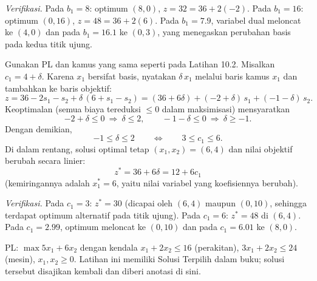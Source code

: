 \emph{Verifikasi.} Pada $b_1 = 8$: optimum $(8, 0)$, $z = 32 = 36 + 2(-2)$. Pada $b_1 = 16$: optimum $(0, 16)$, $z = 48 = 36 + 2(6)$. Pada $b_1 = 7.9$, variabel dual meloncat ke $(4, 0)$ dan pada $b_1 = 16.1$ ke $(0, 3)$, yang menegaskan perubahan basis pada kedua titik ujung.


Gunakan PL dan kamus yang sama seperti pada Latihan 10.2. Misalkan $c_1 = 4 + \delta$. Karena $x_1$ bersifat basis, nyatakan $\delta\, x_1$ melalui baris kamus $x_1$ dan tambahkan ke baris objektif:
\[
z = 36 - 2s_1 - s_2 + \delta\,(6 + s_1 - s_2)
  = (36 + 6\delta) + (-2 + \delta)\,s_1 + (-1 - \delta)\,s_2 .
\]
Keoptimalan (semua biaya tereduksi $\le 0$ dalam maksimisasi) mensyaratkan
\[
-2 + \delta \le 0 \ \Rightarrow\ \delta \le 2,
\qquad
-1 - \delta \le 0 \ \Rightarrow\ \delta \ge -1 .
\]
Dengan demikian,
\[
-1 \le \delta \le 2
\qquad\Longleftrightarrow\qquad
\boxed{3 \le c_1 \le 6}.
\]
Di dalam rentang, solusi optimal tetap $(x_1, x_2) = (6, 4)$ dan nilai objektif berubah secara linier:
\[
z^* = 36 + 6\delta = 12 + 6 c_1
\]
(kemiringannya adalah $x_1^* = 6$, yaitu nilai variabel yang koefisiennya berubah).

\emph{Verifikasi.} Pada $c_1 = 3$: $z^* = 30$ (dicapai oleh $(6,4)$ maupun $(0,10)$, sehingga terdapat optimum alternatif pada titik ujung). Pada $c_1 = 6$: $z^* = 48$ di $(6,4)$. Pada $c_1 = 2.99$, optimum meloncat ke $(0, 10)$ dan pada $c_1 = 6.01$ ke $(8, 0)$.


PL: $\max 5x_1 + 6x_2$ dengan kendala $x_1 + 2x_2 \le 16$ (perakitan), $3x_1 + 2x_2 \le 24$ (mesin), $x_1, x_2 \ge 0$. Latihan ini memiliki Solusi Terpilih dalam buku; solusi tersebut disajikan kembali dan diberi anotasi di sini.

